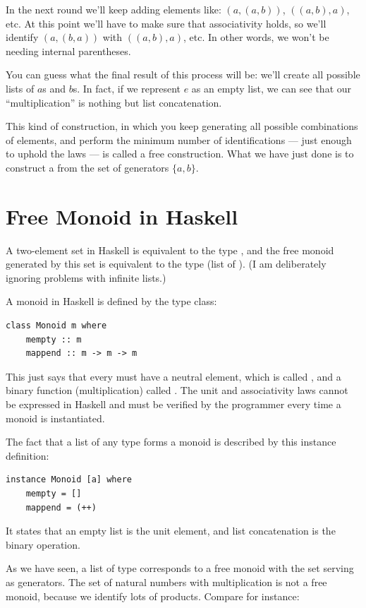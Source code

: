 \noindent
In the next round we'll keep adding elements like:
$(a, (a, b))$, $((a, b), a)$, etc. At this point we'll
have to make sure that associativity holds, so we'll identify
$(a, (b, a))$ with $((a, b), a)$, etc. In other words,
we won't be needing internal parentheses.

You can guess what the final result of this process will be: we'll
create all possible lists of $a$s and $b$s. In fact, if we
represent $e$ as an empty list, we can see that our
``multiplication'' is nothing but list concatenation.

This kind of construction, in which you keep generating all possible
combinations of elements, and perform the minimum number of
identifications --- just enough to uphold the laws --- is called a free
construction. What we have just done is to construct a  from the set of generators $\{a, b\}$.

\section{Free Monoid in Haskell}

A two-element set in Haskell is equivalent to the type ,
and the free monoid generated by this set is equivalent to the type
\code{{[}Bool{]}} (list of ). (I am deliberately ignoring
problems with infinite lists.)

A monoid in Haskell is defined by the type class:

\begin{Verbatim}
class Monoid m where
    mempty :: m
    mappend :: m -> m -> m
\end{Verbatim}
This just says that every  must have a neutral element,
which is called , and a binary function (multiplication)
called . The unit and associativity laws cannot be
expressed in Haskell and must be verified by the programmer every time a
monoid is instantiated.

The fact that a list of any type forms a monoid is described by this
instance definition:

\begin{Verbatim}
instance Monoid [a] where
    mempty = []
    mappend = (++)
\end{Verbatim}
It states that an empty list \code{{[}{]}} is the unit element, and
list concatenation \code{(++)} is the binary operation.

As we have seen, a list of type  corresponds to a free monoid
with the set  serving as generators. The set of natural
numbers with multiplication is not a free monoid, because we identify
lots of products. Compare for instance:

